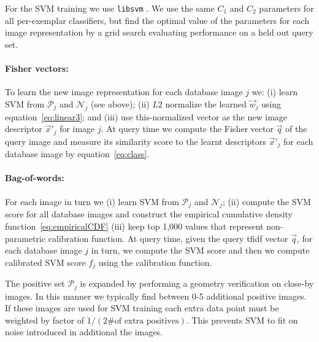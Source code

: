         For the SVM training we use {\tt libsvm} \cite{libsvm}. We use the same $C_1$ and $C_2$ parameters for all per-exemplar classifiers, but find the optimal value of the parameters for each image representation by a grid search evaluating performance on a held out query set.
        \paragraph{Fisher vectors:}
        To learn the new image representation for each database image $j$ we: (i) learn SVM from $\mathcal P_j$ and $\mathcal N_j$ (see above); (ii) $L2$ normalize the learned $\vec{w}_j$ using equation~\eqref{eq:linear3}; and (iii) use this-normalized vector as the new image descriptor $\vec{x}'_j$ for image $j$. At query time we compute the Fisher vector $\vec{q}$ of the query image and measure its similarity score to the learnt descriptors $\vec{x}'_j$ for each database image by equation~\eqref{eq:class}.
        
        \paragraph{Bag-of-words:}
        For each image in turn we (i) learn SVM from $\mathcal P_j$ and $\mathcal N_j$; (ii) compute the SVM score for all database images and construct the empirical cumulative density function~\eqref{eq:empiricalCDF} (iii) keep top 1,000 values that represent non-parametric calibration function. At query time, given the query tfidf vector $\vec{q}$, for each database image $j$ in turn, we compute the SVM score and then we compute calibrated SVM score $f_j$ using the calibration function.

        The positive set $\mathcal P_j$ is expanded by performing a geometry verification on close-by images. In this manner we typically find between 0-5 additional positive images. If these images are used for SVM training each extra data point must be weighted by factor of $1/(2\#\text{of extra positives})$. This prevents SVM to fit on noise introduced in additional the images.


